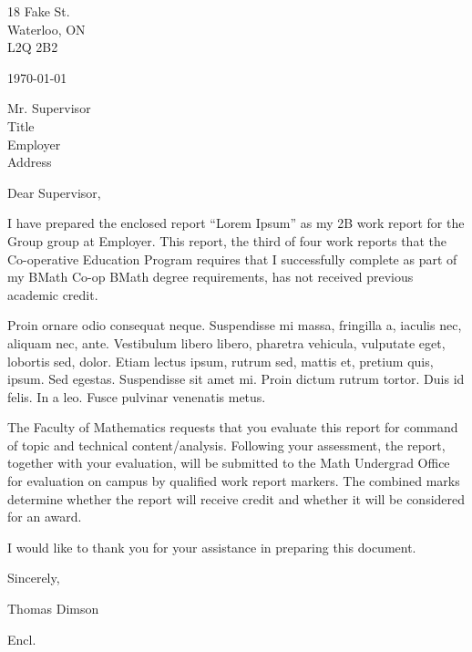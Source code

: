 \documentclass[12pt]{article}
\begin{document}



\begin{waterlooletter}
18 Fake St.\\
Waterloo, ON\\
L2Q 2B2

\today

Mr. Supervisor\\
Title\\
Employer\\
Address

Dear Supervisor,

I have prepared the enclosed report ``Lorem Ipsum'' as my 2B work report for the Group group at Employer. This report, the third of four work reports that the Co-operative Education Program requires that I successfully complete as part of my BMath Co-op BMath degree requirements, has not received previous academic credit.

Proin ornare odio consequat neque. Suspendisse mi massa, fringilla a, iaculis nec, aliquam nec, ante. Vestibulum libero libero, pharetra vehicula, vulputate eget, lobortis sed, dolor. Etiam lectus ipsum, rutrum sed, mattis et, pretium quis, ipsum. Sed egestas. Suspendisse sit amet mi. Proin dictum rutrum tortor. Duis id felis. In a leo. Fusce pulvinar venenatis metus.

The Faculty of Mathematics requests that you evaluate this report for command of topic and technical content/analysis. Following your assessment, the report, together with your evaluation, will be submitted to the Math Undergrad Office for evaluation on campus by qualified work report markers. The combined marks determine whether the report will receive credit and whether it will be considered for an award.

I would like to thank you for your assistance in preparing this document.

Sincerely,\\

\vspace{1.5em}

Thomas Dimson

Encl.
\end{waterlooletter}
\end{document}
